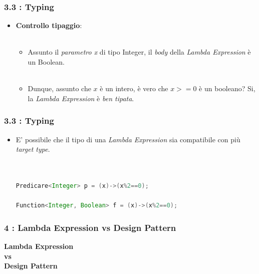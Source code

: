 \documentclass{beamer}
\begin{document}

\begin{frame}[fragile]
	\frametitle{\textbf{3.3 : Typing}}
	\begin{itemize}
		\item
			\textbf{Controllo tipaggio}:\\\
			\begin{itemize}
				\item 
					Assunto il \textit{parametro x} di tipo Integer, il \textit{body} della \textit{Lambda Expression} è un Boolean.\\\
				\item 
					Dunque, assunto che $x$ è un intero, è vero che $x>=0$ è un booleano? Si, la \textit{Lambda Expression} è \textit{ben tipata}.
			\end{itemize}
	\end{itemize}
\end{frame}


\begin{frame}[fragile]
	\frametitle{\textbf{3.3 : Typing}}
	\begin{itemize}
		\item
			E' possibile che il tipo di una \textit{Lambda Expression} sia compatibile con più \textit{target type}.\\\
\begin{lstlisting}[language=Java]

Predicare<Integer> p = (x)->(x%2==0);

Function<Integer, Boolean> f = (x)->(x%2==0);

\end{lstlisting}
	\end{itemize}
\end{frame}


\begin{frame}
	\frametitle{\textbf{4 : Lambda Expression vs Design Pattern}}
	\begin{center}
		\textbf{\Huge Lambda Expression\\ vs\\ Design Pattern}
	\end{center}
\end{frame}
\end{document}
